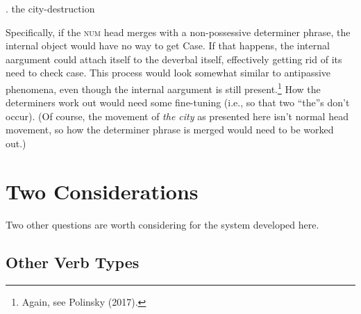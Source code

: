 \documentclass[12pt]{article}
\newcommand*{\textsub}[1]{\ensuremath{_\textrm{{\scriptsize #1}}}}
\begin{document}
\singlespacing 

\ex. \label{compound} the city-destruction

\vspace*{-10pt}
\par \hfill \par

\doublespacing

Specifically, if the \textsc{num} head merges with a non-possessive determiner phrase, the internal object would have no way to get Case. If that happens, the internal aargument could attach itself to the deverbal itself, effectively getting rid of its need to check case. This process would look somewhat similar to antipassive phenomena, even though the internal aargument is still present.\footnote{ Again, see Polinsky (2017).} How the determiners work out would need some fine-tuning (i.e., so that two ``the''s don't occur). (Of course, the movement of \textit{the city} as presented here isn't normal head movement, so how the determiner phrase is merged would need to be worked out.)

\section{Two Considerations}\label{cons}

Two other questions are worth considering for the system developed here. 

\subsection{Other Verb Types}\label{cons1}
\end{document}
